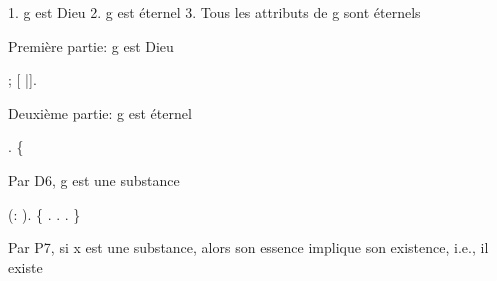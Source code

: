 \documentclass[10pt]{report}
\begin{document}
\begin{coqdoccode}
\begin{coqdoccomment}
\coqdocindent{2.50em}
1.\coqdocindent{0.50em}
g\coqdocindent{0.50em}
est\coqdocindent{0.50em}
Dieu\coqdoceol
\coqdocindent{2.50em}
2.\coqdocindent{0.50em}
g\coqdocindent{0.50em}
est\coqdocindent{0.50em}
éternel\coqdoceol
\coqdocindent{2.50em}
3.\coqdocindent{0.50em}
Tous\coqdocindent{0.50em}
les\coqdocindent{0.50em}
attributs\coqdocindent{0.50em}
de\coqdocindent{0.50em}
g\coqdocindent{0.50em}
sont\coqdocindent{0.50em}
éternels\coqdocindent{0.50em}
\end{coqdoccomment}
\coqdoceol
\coqdocemptyline
\coqdocindent{1.00em}
\begin{coqdoccomment}
\coqdocindent{0.50em}
Première\coqdocindent{0.50em}
partie:\coqdocindent{0.50em}
g\coqdocindent{0.50em}
est\coqdocindent{0.50em}
Dieu\coqdocindent{0.50em}
\end{coqdoccomment}
\coqdoceol
\coqdocindent{1.00em}
; [ |].\coqdoceol
\coqdocemptyline
\coqdocindent{1.00em}
\begin{coqdoccomment}
\coqdocindent{0.50em}
Deuxième\coqdocindent{0.50em}
partie:\coqdocindent{0.50em}
g\coqdocindent{0.50em}
est\coqdocindent{0.50em}
éternel\coqdocindent{0.50em}
\end{coqdoccomment}
\coqdoceol
\coqdocindent{1.00em}
.\coqdoceol
\coqdocindent{1.00em}
\{\coqdoceol
\coqdocindent{2.00em}
\begin{coqdoccomment}
\coqdocindent{0.50em}
Par\coqdocindent{0.50em}
D6,\coqdocindent{0.50em}
g\coqdocindent{0.50em}
est\coqdocindent{0.50em}
une\coqdocindent{0.50em}
substance\coqdocindent{0.50em}
\end{coqdoccomment}
\coqdoceol
\coqdocindent{2.00em}
 (:  ).\coqdoceol
\coqdocindent{2.00em}
\{    .  .  . \}\coqdoceol
\coqdocindent{2.00em}
\coqdoceol
\coqdocindent{2.00em}
\begin{coqdoccomment}
\coqdocindent{0.50em}
Par\coqdocindent{0.50em}
P7,\coqdocindent{0.50em}
si\coqdocindent{0.50em}
x\coqdocindent{0.50em}
est\coqdocindent{0.50em}
une\coqdocindent{0.50em}
substance,\coqdocindent{0.50em}
alors\coqdocindent{0.50em}
son\coqdocindent{0.50em}
essence\coqdocindent{0.50em}
implique\coqdocindent{0.50em}
son\coqdocindent{0.50em}
existence,\coqdoceol
\coqdocindent{3.50em}
i.e.,\coqdocindent{0.50em}
il\coqdocindent{0.50em}
existe\coqdocindent{0.50em}

\end{coqdoccomment}
\end{coqdoccode}
\end{document}
